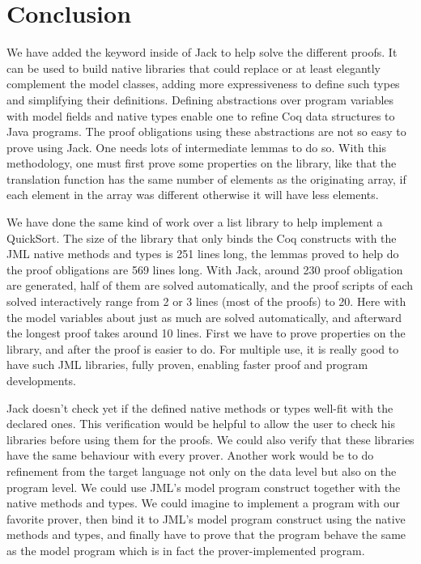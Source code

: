 \section{Conclusion}
We have added the  keyword inside of Jack to help solve the 
different proofs. It can be used to build  native libraries that could 
replace or at least elegantly complement the model classes, adding more 
expressiveness to define such types and  simplifying their definitions.
Defining abstractions over program variables with model fields and native types
 enable one to refine Coq data structures to Java programs. 
The proof obligations using these abstractions are not so easy to prove 
using Jack. 
One needs lots of intermediate lemmas to do so. 
With this methodology, one must first prove some properties on the library, 
like that the translation function  has the same number 
of elements as the originating array, if each element in the array
was different otherwise it will have less elements.

We have done the same kind of work over a list library to help implement a 
QuickSort. The size of the library that only binds the Coq constructs with 
the JML native methods and types is 251 lines long,
the lemmas proved to help do the proof obligations are 569 lines long. 
With Jack, around 230 proof obligation are generated, half of them are 
solved automatically, and the proof scripts of each solved interactively 
range from 2 or 3 lines (most of the proofs) to 20. 
Here with the model variables about just as much are solved automatically, 
and afterward the longest proof takes around 10 lines.
First we have to prove properties on the library, and after the proof 
is easier to do. 
For multiple use, it is really good to have such JML libraries, 
fully proven, enabling faster proof and program developments.

Jack doesn't check yet if the defined native methods or types well-fit with
 the declared ones. This verification would be helpful to
allow the user to check his libraries before using them for the proofs.
We could also verify that
these libraries have the same behaviour with every prover.
Another work would be to do  refinement from the 
target language not only on the data level but also on the program
level. We could use JML's model program construct
together with the native methods and types. We could imagine 
to implement a program with our favorite prover, then bind it
to JML's model program construct using the native methods and types,
 and finally have to prove that the program behave the same
as the model program which is in fact the prover-implemented program.




